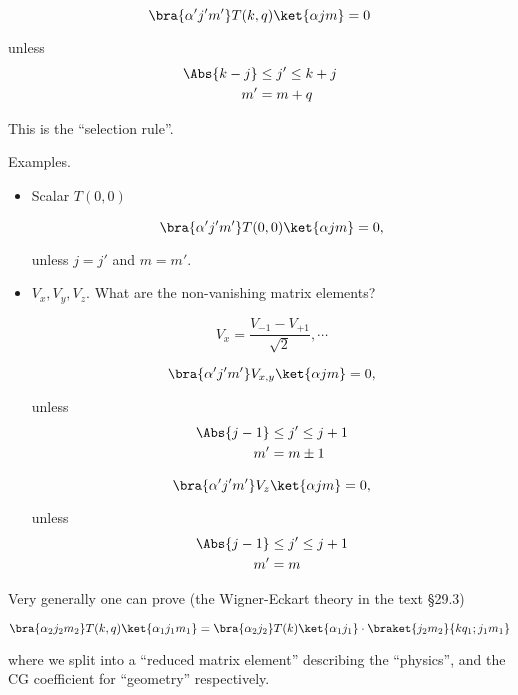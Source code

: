 \begin{equation}\label{eqn:qmTwoL20:n}
\bra{\alpha' j' m'} T(k, q) \ket{\alpha j m} = 0 
\end{equation}

unless 
\begin{align}\label{eqn:qmTwoL20:n}
\Abs{k - j} &\le j' \le k + j \\
m' &= m + q
\end{align}

This is the ``selection rule''.

Examples.

\begin{itemize}
\item Scalar $T(0, 0)$

\begin{equation}\label{eqn:qmTwoL20:n}
\bra{\alpha' j' m'} T(0, 0) \ket{\alpha j m} = 0 ,
\end{equation}

unless $j = j'$ and $m = m'$.

\item $V_x, V_y, V_z$.  What are the non-vanishing matrix elements?

\begin{equation}\label{eqn:qmTwoL20:n}
V_x = \frac{ V_{-1} - V_{+1}}{\sqrt{2}}, \cdots
\end{equation}

\begin{equation}\label{eqn:qmTwoL20:n}
\bra{\alpha' j' m'} V_{x, y} \ket{\alpha j m} = 0 ,
\end{equation}

unless
\begin{align}\label{eqn:qmTwoL20:n}
\Abs{j - 1} &\le j' \le j + 1  \\
m' &= m \pm 1
\end{align}

\begin{equation}\label{eqn:qmTwoL20:n}
\bra{\alpha' j' m'} V_{z} \ket{\alpha j m} = 0 ,
\end{equation}

unless
\begin{align}\label{eqn:qmTwoL20:n}
\Abs{j - 1} &\le j' \le j + 1  \\
m' &= m  
\end{align}
\end{itemize}

Very generally one can prove (the Wigner-Eckart theory in the text \S 29.3)

\begin{equation}\label{eqn:qmTwoL20:n}
\bra{\alpha_2 j_2 m_2} T(k, q) \ket{\alpha_1 j_1 m_1}
=
\bra{\alpha_2 j_2 } T(k) \ket{\alpha_1 j_1} \cdot
\braket{j_2 m_2}{k q_1 ; j_1 m_1} 
\end{equation}

where we split into a ``reduced matrix element'' describing the ``physics'', and the CG coefficient for ``geometry'' respectively.

\EndArticle
